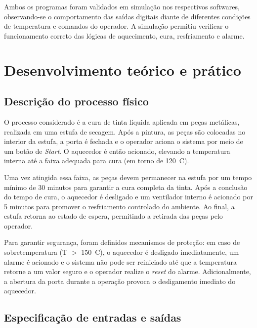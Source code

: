 \documentclass[
  12pt,
  openright,
  oneside,
  a4paper,
  chapter=TITLE,
  section=TITLE,
  brazilian
]{abntex2}
\begin{document}
Ambos os programas foram validados em simula\c{c}\~{a}o nos respectivos softwares, observando-se o comportamento das sa\'{i}das digitais diante de diferentes condi\c{c}\~{o}es de temperatura e comandos do operador. A simula\c{c}\~{a}o permitiu verificar o funcionamento correto das l\'{o}gicas de aquecimento, cura, resfriamento e alarme.

\chapter{Desenvolvimento te\'{o}rico e pr\'{a}tico}

\section{Descri\c{c}\~{a}o do processo f\'{i}sico}

O processo considerado \'{e} a cura de tinta l\'{i}quida aplicada em pe\c{c}as met\'{a}licas, realizada em uma estufa de secagem. Ap\'{o}s a pintura, as pe\c{c}as s\~{a}o colocadas no interior da estufa, a porta \'{e} fechada e o operador aciona o sistema por meio de um bot\~{a}o de \textit{Start}. O aquecedor \'{e} ent\~{a}o acionado, elevando a temperatura interna at\'{e} a faixa adequada para cura (em torno de 120~\textdegree{}C).

Uma vez atingida essa faixa, as pe\c{c}as devem permanecer na estufa por um tempo m\'{i}nimo de 30 minutos para garantir a cura completa da tinta. Ap\'{o}s a conclus\~{a}o do tempo de cura, o aquecedor \'{e} desligado e um ventilador interno \'{e} acionado por 5 minutos para promover o resfriamento controlado do ambiente. Ao final, a estufa retorna ao estado de espera, permitindo a retirada das pe\c{c}as pelo operador.

Para garantir seguran\c{c}a, foram definidos mecanismos de prote\c{c}\~{a}o: em caso de sobretemperatura (T $>$ 150~\textdegree{}C), o aquecedor \'{e} desligado imediatamente, um alarme \'{e} acionado e o sistema n\~{a}o pode ser reiniciado at\'{e} que a temperatura retorne a um valor seguro e o operador realize o \textit{reset} do alarme. Adicionalmente, a abertura da porta durante a opera\c{c}\~{a}o provoca o desligamento imediato do aquecedor.

\section{Especifica\c{c}\~{a}o de entradas e sa\'{i}das}
\end{document}
